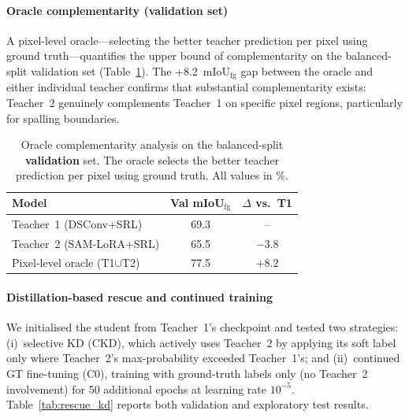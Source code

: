 \documentclass[review,authoryear]{elsarticle}
\begin{document}
\paragraph{Oracle complementarity (validation set)}
A pixel-level oracle---selecting the better teacher prediction per pixel using ground truth---quantifies the upper bound of complementarity on the balanced-split validation set (Table~\ref{tab:oracle}).
The +8.2~mIoU$_{\text{fg}}$ gap between the oracle and either individual teacher confirms that substantial complementarity exists: Teacher~2 genuinely complements Teacher~1 on specific pixel regions, particularly for spalling boundaries.

\begin{table}[t]
\centering
\caption{Oracle complementarity analysis on the balanced-split \textbf{validation} set. The oracle selects the better teacher prediction per pixel using ground truth. All values in \%.}
\label{tab:oracle}
\begin{tabular}{lcc}
\toprule
Model & Val mIoU$_{\text{fg}}$ & $\Delta$ vs.\ T1 \\
\midrule
Teacher~1 (DSConv+SRL) & 69.3 & -- \\
Teacher~2 (SAM-LoRA+SRL) & 65.5 & $-$3.8 \\
Pixel-level oracle (T1$\cup$T2) & 77.5 & +8.2 \\
\bottomrule
\end{tabular}
\end{table}

\paragraph{Distillation-based rescue and continued training}
We initialised the student from Teacher~1's checkpoint and tested two strategies: (i)~selective KD (CKD), which actively uses Teacher~2 by applying its soft label only where Teacher~2's max-probability exceeded Teacher~1's; and (ii)~continued GT fine-tuning (C0), training with ground-truth labels only (no Teacher~2 involvement) for 50 additional epochs at learning rate $10^{-5}$.
Table~\ref{tab:rescue_kd} reports both validation and exploratory test results.
\end{document}
